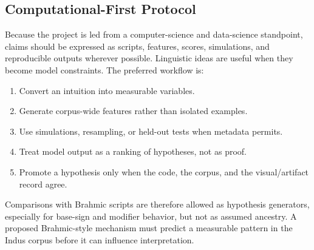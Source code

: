 \subsection{Computational-First Protocol}

Because the project is led from a computer-science and data-science standpoint, claims should be expressed as scripts, features, scores, simulations, and reproducible outputs wherever possible. Linguistic ideas are useful when they become model constraints. The preferred workflow is:

\begin{enumerate}
  \item Convert an intuition into measurable variables.
  \item Generate corpus-wide features rather than isolated examples.
  \item Use simulations, resampling, or held-out tests when metadata permits.
  \item Treat model output as a ranking of hypotheses, not as proof.
  \item Promote a hypothesis only when the code, the corpus, and the visual/artifact record agree.
\end{enumerate}

Comparisons with Brahmic scripts are therefore allowed as hypothesis generators, especially for base-sign and modifier behavior, but not as assumed ancestry. A proposed Brahmic-style mechanism must predict a measurable pattern in the Indus corpus before it can influence interpretation.

